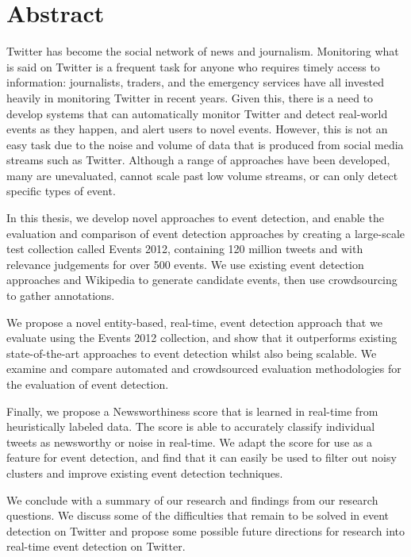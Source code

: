
\chapter*{Abstract}
\thispagestyle{empty}
\vspace{-1cm}

Twitter has become the social network of news and journalism. Monitoring what is said on Twitter is a frequent task for anyone who requires timely access to information: journalists, traders, and the emergency services have all invested heavily in monitoring Twitter in recent years.
Given this, there is a need to develop systems that can automatically monitor Twitter and detect real-world events as they happen, and alert users to novel events. However, this is not an easy task due to the noise and volume of data that is produced from social media streams such as Twitter. Although a range of approaches have been developed, many are unevaluated, cannot scale past low volume streams, or can only detect specific types of event.

In this thesis, we develop novel approaches to event detection, and enable the evaluation and comparison of event detection approaches by creating a large-scale test collection called Events 2012, containing 120 million tweets and with relevance judgements for over 500 events. We use existing event detection approaches and Wikipedia to generate candidate events, then use crowdsourcing to gather annotations.

We propose a novel entity-based, real-time, event detection approach that we evaluate using the Events 2012 collection, and show that it outperforms existing state-of-the-art approaches to event detection whilst also being scalable.
We examine and compare automated and crowdsourced evaluation methodologies for the evaluation of event detection.

Finally, we propose a Newsworthiness score that is learned in real-time from heuristically labeled data. The score is able to accurately classify individual tweets as newsworthy or noise in real-time. We adapt the score for use as a feature for event detection, and find that it can easily be used to filter out noisy clusters and improve existing event detection techniques.

We conclude with a summary of our research and findings from our research questions. We discuss some of the difficulties that remain to be solved in event detection on Twitter and propose some possible future directions for research into real-time event detection on Twitter.
